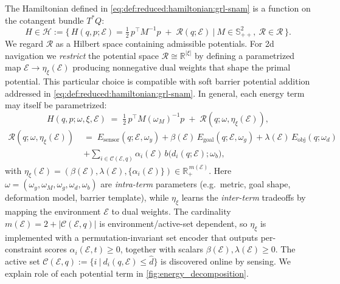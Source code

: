     The Hamiltonian defined in \cref{eq:def:reduced:hamiltonian:grl-snam} is a function on the cotangent bundle $T^{*}Q$:
\[
H \in \mathscr{H}:=\big\{\,H(q,p;\mathcal{E})=\tfrac12\,p^\top M^{-1}p\;+\;\mathcal{R}(q;\mathcal{E}) 
\ \big|\ M\in \mathbb{S}_{++}^2,\ \mathcal{R}\in \mathscr{R} \,\big\}.
\]
We regard $\mathscr{R}$ as a Hilbert space containing admissible potentials. For 2d navigation we \emph{restrict} the potential space $\mathscr{R}\cong \mathbb{R}^{\vert \xi\vert}$ by defining a parametrized map $\mathcal E\!\to\!\eta_{\xi}(\mathcal E)$ producing
nonnegative dual weights that shape the primal potential. This particular choice is compatible with soft barrier potential addition addressed in \cref{eq:def:reduced:hamiltonian:grl-snam}. In general, each energy
term may itself be parametrized:
\[
H(q,p;\omega,\xi,\mathcal E)\;=\;\tfrac12\,p^\top M(\omega_M)^{-1}p
\;+\;\mathcal{R}(q;\omega,\eta_{\xi}(\mathcal E)),
\]
\vspace{-0.75ex}
\begin{equation}
\begin{aligned}
\mathcal{R}(q;\omega, \eta_{\xi}(\mathcal E))\;&=\;
E_{\mathrm{sensor}}(q;\mathcal{E},\omega_y)+ 
\beta(\mathcal E)\,E_{\mathrm{goal}}(q;\mathcal E,\omega_g)
+\lambda(\mathcal E)\,E_{\mathrm{obj}}(q;\omega_d)
\\
&+\sum_{i\in\mathcal C(\mathcal E,q)} \alpha_i(\mathcal E)\,
b\big(d_i(q;\mathcal E);\omega_b\big),
\end{aligned}
\end{equation}
with $\eta_{\xi}(\mathcal E)\!=\!(\beta(\mathcal E),\lambda(\mathcal E),\{\alpha_i(\mathcal E)\})\in\mathbb R_+^{\,m(\mathcal E)}$.
Here $\omega\!=\!(\omega_y,\omega_M,\omega_g,\omega_d,\omega_b)$ are \emph{intra-term} parameters
(e.g.\ metric, goal shape, deformation model, barrier template), while $\eta_\xi$
learns the \emph{inter-term} tradeoffs by mapping the environment $\mathcal E$
to dual weights. The cardinality $m(\mathcal E)=2+|\mathcal C(\mathcal E,q)|$ is
environment/active-set dependent, so $\eta_\xi$ is implemented with a permutation-invariant
set encoder that outputs per-constraint scores
$\alpha_i(\mathcal E,t)\!\ge\!0$, together
with scalars $\beta(\mathcal E),\lambda(\mathcal E)\!\ge\!0$. The active set $\mathcal{C}(\mathcal{E},q):=\{i~|~d_i(q,\mathcal{E})\leq \hat{d}\}$ is discovered online by sensing. We explain role of each potential term in \cref{fig:energy_decomposition}.




